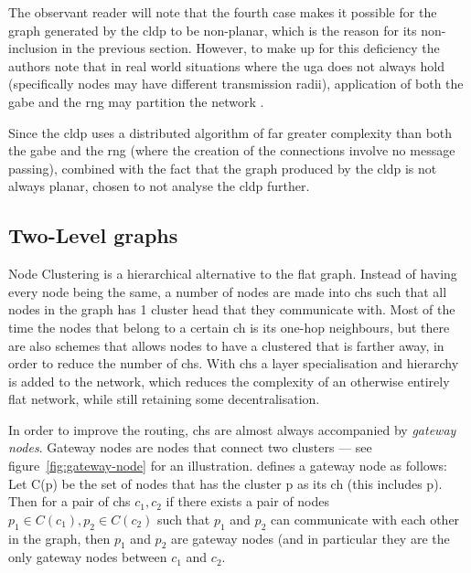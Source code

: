 The observant reader will note that the fourth case makes it possible for the graph generated by the \ac{cldp} to be non-planar, which is the reason for its non-inclusion in the previous section. However, to make up for this deficiency the authors note that in real world situations where the \ac{uga} does not always hold (specifically nodes may have different transmission radii), application of both the \ac{gabe} and the \ac{rng} may partition the network \cite{practical}. 

Since the \ac{cldp} uses a distributed algorithm of far greater complexity than both the \ac{gabe} and the \ac{rng} (where the creation of the connections involve no message passing), combined with the fact that the graph produced by the \ac{cldp} is not always planar, chosen to not analyse the \ac{cldp} further.

\subsection{Two-Level graphs}


\label{section:cluster_methods}
Node Clustering is a hierarchical alternative to the flat graph. Instead of having every node being the same, a number of nodes are made into \acp{ch} such that all nodes in the graph has 1 cluster head that they communicate with. Most of the time the nodes that belong to a certain \ac{ch} is its one-hop neighbours, but there are also schemes that allows nodes to have a clustered that is farther away, in order to reduce the number of \acp{ch}. With \acp{ch} a layer specialisation and hierarchy is added to the network, which reduces the complexity of an otherwise entirely flat network, while still retaining some decentralisation.

In order to improve the routing, \acp{ch} are almost always accompanied by \emph{gateway nodes}. Gateway nodes are nodes that connect two clusters --- see figure~\ref{fig:gateway-node} for an illustration. \cite{spanners} defines a gateway node as follows:
Let C(p) be the set of nodes that has the cluster p as its \ac{ch} (this includes p). Then for a pair of \acp{ch} $c_1, c_2$ if there exists a pair of nodes $p_1 \in C(c_1), p_2 \in C(c_2)$ such that $p_1$ and $p_2$ can communicate with each other in the graph, then $p_1$ and $p_2$ are gateway nodes (and in particular they are the only gateway nodes between $c_1$ and $c_2$.  

